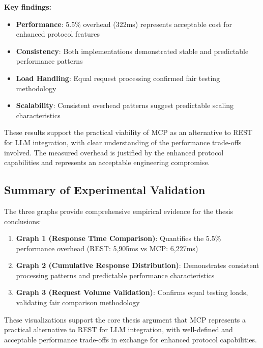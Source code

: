 \textbf{Key findings:}

\begin{itemize}
    \item \textbf{Performance}: 5.5\% overhead (322ms) represents acceptable cost for enhanced protocol features
    \item \textbf{Consistency}: Both implementations demonstrated stable and predictable performance patterns
    \item \textbf{Load Handling}: Equal request processing confirmed fair testing methodology
    \item \textbf{Scalability}: Consistent overhead patterns suggest predictable scaling characteristics
\end{itemize}

These results support the practical viability of MCP as an alternative to REST for LLM integration, with clear understanding of the performance trade-offs involved. The measured overhead is justified by the enhanced protocol capabilities and represents an acceptable engineering compromise.

\subsection{Summary of Experimental Validation}

The three graphs provide comprehensive empirical evidence for the thesis conclusions:

\begin{enumerate}
    \item \textbf{Graph 1 (Response Time Comparison)}: Quantifies the 5.5\% performance overhead (REST: 5,905ms vs MCP: 6,227ms)
    \item \textbf{Graph 2 (Cumulative Response Distribution)}: Demonstrates consistent processing patterns and predictable performance characteristics
    \item \textbf{Graph 3 (Request Volume Validation)}: Confirms equal testing loads, validating fair comparison methodology
\end{enumerate}

These visualizations support the core thesis argument that MCP represents a practical alternative to REST for LLM integration, with well-defined and acceptable performance trade-offs in exchange for enhanced protocol capabilities.
